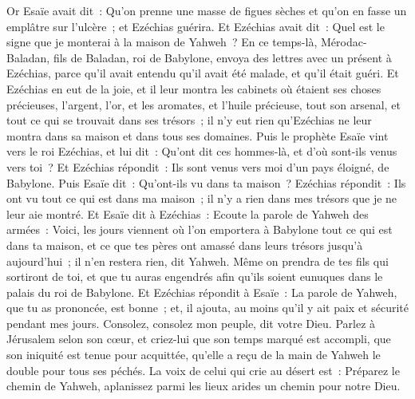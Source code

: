 \begin{multicols}{2}
Or Esaïe avait dit~: Qu'on prenne une masse de figues sèches et qu'on en fasse un emplâtre sur l'ulcère~; et Ezéchias guérira.
Et Ezéchias avait dit~: Quel est le signe que je monterai à la maison de Yahweh~?
\VerseOne{}En ce temps-là, Mérodac-Baladan, fils de Baladan, roi de Babylone, envoya des lettres avec un présent à Ezéchias, parce qu'il avait entendu qu'il avait été malade, et qu'il était guéri.
Et Ezéchias en eut de la joie, et il leur montra les cabinets où étaient ses choses précieuses, l'argent, l'or, et les aromates, et l'huile précieuse, tout son arsenal, et tout ce qui se trouvait dans ses trésors~; il n'y eut rien qu'Ezéchias ne leur montra dans sa maison et dans tous ses domaines.
Puis le prophète Esaïe vint vers le roi Ezéchias, et lui dit~: Qu'ont dit ces hommes-là, et d'où sont-ils venus vers toi~? Et Ezéchias répondit~: Ils sont venus vers moi d'un pays éloigné, de Babylone.
Puis Esaïe dit~: Qu'ont-ils vu dans ta maison~? Ezéchias répondit~: Ils ont vu tout ce qui est dans ma maison~; il n'y a rien dans mes trésors que je ne leur aie montré.
Et Esaïe dit à Ezéchias~: Ecoute la parole de Yahweh des armées~:
Voici, les jours viennent où l'on emportera à Babylone tout ce qui est dans ta maison, et ce que tes pères ont amassé dans leurs trésors jusqu'à aujourd'hui~; il n'en restera rien, dit Yahweh.
Même on prendra de tes fils qui sortiront de toi, et que tu auras engendrés afin qu'ils soient eunuques dans le palais du roi de Babylone.
Et Ezéchias répondit à Esaïe~: La parole de Yahweh, que tu as prononcée, est bonne~; et, il ajouta, au moins qu'il y ait paix et sécurité pendant mes jours.
\VerseOne{}Consolez, consolez mon peuple, dit votre Dieu.
Parlez à Jérusalem selon son cœur, et criez-lui que son temps marqué est accompli, que son iniquité est tenue pour acquittée, qu'elle a reçu de la main de Yahweh le double pour tous ses péchés.
La voix de celui qui crie au désert est~: Préparez le chemin de Yahweh, aplanissez parmi les lieux arides un chemin pour notre Dieu.

\end{multicols}
